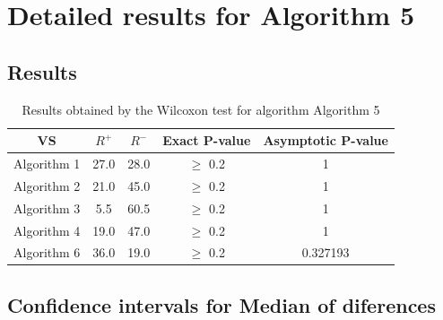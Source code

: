 \documentclass[a4paper,10pt]{article}
\begin{document}
 \clearpage 


\section{Detailed results for Algorithm 5}


\subsection{Results}

\begin{table}[!htp]
\centering\small
\begin{tabular}{
|c|c|c|c|c|}
\hline
 VS & $R^{+}$ & $R^{-}$ & Exact P-value & Asymptotic P-value \\ \hline 
Algorithm 1 & 27.0 & 28.0 & $\geq$ 0.2 & 1\\ \hline 
Algorithm 2 & 21.0 & 45.0 & $\geq$ 0.2 & 1\\ \hline 
Algorithm 3 & 5.5 & 60.5 & $\geq$ 0.2 & 1\\ \hline 
Algorithm 4 & 19.0 & 47.0 & $\geq$ 0.2 & 1\\ \hline 
Algorithm 6 & 36.0 & 19.0 & $\geq$ 0.2 & 0.327193\\ \hline 

\end{tabular}
\caption{Results obtained by the Wilcoxon test for algorithm Algorithm 5}
\end{table}

\subsection{Confidence intervals for Median of diferences}
\end{document}
